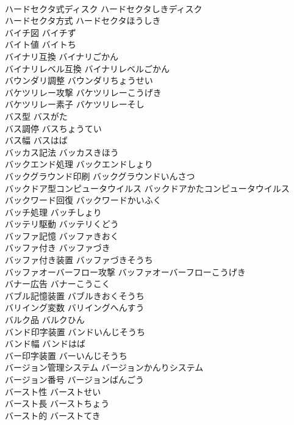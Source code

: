 \documentclass[8pt]{extreport}
\begin{document}
\begin{CJK}{UTF8}{min}
\\	ハードセクタ式ディスク	ハードセクタしきディスク	
\\	ハードセクタ方式	ハードセクタほうしき	
\\	バイチ図	バイチず	
\\	バイト値	バイトち	
\\	バイナリ互換	バイナリごかん	
\\	バイナリレベル互換	バイナリレベルごかん	
\\	バウンダリ調整	バウンダリちょうせい	
\\	バケツリレー攻撃	バケツリレーこうげき	
\\	バケツリレー素子	バケツリレーそし	
\\	バス型	バスがた	
\\	バス調停	バスちょうてい	
\\	バス幅	バスはば	
\\	バッカス記法	バッカスきほう	
\\	バックエンド処理	バックエンドしょり	
\\	バックグラウンド印刷	バックグラウンドいんさつ	
\\	バックドア型コンピュータウイルス	バックドアかたコンピュータウイルス	
\\	バックワード回復	バックワードかいふく	
\\	バッチ処理	バッチしょり	
\\	バッテリ駆動	バッテリくどう	
\\	バッファ記憶	バッファきおく	
\\	バッファ付き	バッファづき	
\\	バッファ付き装置	バッファづきそうち	
\\	バッファオーバーフロー攻撃	バッファオーバーフローこうげき	
\\	バナー広告	バナーこうこく	
\\	バブル記憶装置	バブルきおくそうち	
\\	バリイング変数	バリイングへんすう	
\\	バルク品	バルクひん	
\\	バンド印字装置	バンドいんじそうち	
\\	バンド幅	バンドはば	
\\	バー印字装置	バーいんじそうち	
\\	バージョン管理システム	バージョンかんりシステム	
\\	バージョン番号	バージョンばんごう	
\\	バースト性	バーストせい	
\\	バースト長	バーストちょう	
\\	バースト的	バーストてき	

\end{CJK}
\end{document}
